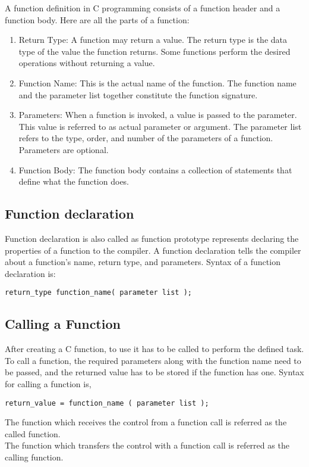 A function definition in C programming consists of a function header and a function body. Here are all the parts of a function:
\begin{enumerate}
    \item Return Type: A function may return a value. The return type is the data type of the value the function returns. Some functions perform the desired operations without returning a value. 
    \item Function Name: This is the actual name of the function. The function name and the parameter list together constitute the function signature.
    \item Parameters: When a function is invoked, a value is passed to the parameter. This value is referred to as actual parameter or argument. The parameter list refers to the type, order, and number of the parameters of a function. Parameters are optional.
    \item Function Body: The function body contains a collection of statements that define what the function does.
\end{enumerate}

\subsection{Function declaration}
Function declaration is also called as function prototype represents declaring the properties of a function to the compiler. A function declaration tells the compiler about a function's name, return type, and parameters. Syntax of a function declaration is: 
\begin{lstlisting}[style=CStyle]
    return_type function_name( parameter list );
\end{lstlisting}

\subsection{Calling a Function}
After creating a C function, to use it has to be called to perform the defined task. To call a function, the required parameters along with the function name need to be passed, and the returned value has to be stored if the function has one. Syntax for calling a function is,

\begin{lstlisting}[style=CStyle]
    return_value = function_name ( parameter list );
\end{lstlisting}

\begin{highlight}
    The function which receives the control from a function call is referred as the called function.\\
    The function which transfers the control with a function call is referred as the calling function.
\end{highlight}

